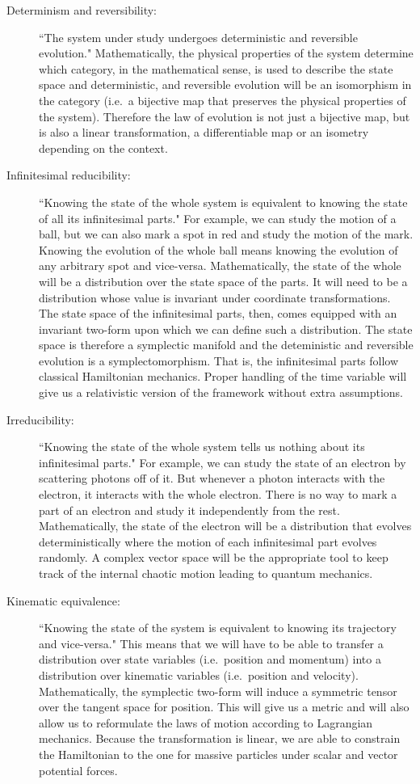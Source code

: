 \documentclass[11pt,letterpaper,fleqn]{memoir} %
\begin{document}
\begin{description}
	\item[Determinism and reversibility:] ``The system under study undergoes deterministic and reversible evolution." Mathematically, the physical properties of the system determine which category, in the mathematical sense, is used to describe the state space and deterministic, and reversible evolution will be an isomorphism in the category (i.e.~a bijective map that preserves the physical properties of the system). Therefore the law of evolution is not just a bijective map, but is also a linear transformation, a differentiable map or an isometry depending on the context.
	
	\item[Infinitesimal reducibility:] ``Knowing the state of the whole system is equivalent to knowing the state of all its infinitesimal parts." For example, we can study the motion of a ball, but we can also mark a spot in red and study the motion of the mark. Knowing the evolution of the whole ball means knowing the evolution of any arbitrary spot and vice-versa. Mathematically, the state of the whole will be a distribution over the state space of the parts. It will need to be a distribution whose value is invariant under coordinate transformations. The state space of the infinitesimal parts, then, comes equipped with an invariant two-form upon which we can define such a distribution. The state space is therefore a symplectic manifold and the deteministic and reversible evolution is a symplectomorphism. That is, the infinitesimal parts follow classical Hamiltonian mechanics. Proper handling of the time variable will give us a relativistic version of the framework without extra assumptions.
	 
	\item[Irreducibility:] ``Knowing the state of the whole system tells us nothing about its infinitesimal parts." For example, we can study the state of an electron by scattering photons off of it. But whenever a photon interacts with the electron, it interacts with the whole electron. There is no way to mark a part of an electron and study it independently from the rest. Mathematically, the state of the electron will be a distribution that evolves deterministically where the motion of each infinitesimal part evolves randomly. A complex vector space will be the appropriate tool to keep track of the internal chaotic motion leading to quantum mechanics.
	
	\item[Kinematic equivalence:] ``Knowing the state of the system is equivalent to knowing its trajectory and vice-versa." This means that we will have to be able to transfer a distribution over state variables (i.e.~position and momentum) into a distribution over kinematic variables (i.e.~position and velocity). Mathematically, the symplectic two-form will induce a symmetric tensor over the tangent space for position. This will give us a metric and will also allow us to reformulate the laws of motion according to Lagrangian mechanics. Because the transformation is linear, we are able to constrain the Hamiltonian to the one for massive particles under scalar and vector potential forces.
\end{description}
\end{document}
